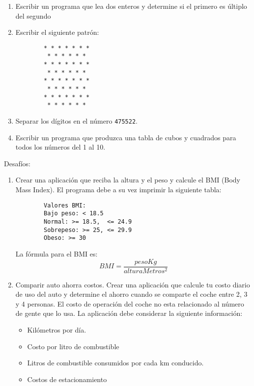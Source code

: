 \documentclass[12pt]{article}
\begin{document}
\begin{enumerate}
\begin{verbatim}
        \end{verbatim}

    \item Escribir un programa que lea dos enteros y determine si el primero es \'ultiplo del segundo
    \item Escribir el siguiente patr\'on:
        \begin{verbatim}
        * * * * * * * 
         * * * * * * 
        * * * * * * *
         * * * * * * 
        * * * * * * *
         * * * * * * 
        * * * * * * *
         * * * * * * 
        \end{verbatim}
    \item Separar los d\'igitos en el n\'umero \texttt{475522}.
    \item Escribir un programa que produzca una tabla de cubos y cuadrados para todos los n\'umeros del 1 al 10.
\end{enumerate}

Desaf\'ios:

\begin{enumerate}
    \item Crear una aplicaci\'on que reciba la altura y el peso y calcule el BMI (Body Mass Index). El programa debe
        a su vez imprimir la siguiente tabla:
        \begin{verbatim}
        Valores BMI: 
        Bajo peso: < 18.5
        Normal: >= 18.5,  <= 24.9
        Sobrepeso: >= 25, <= 29.9
        Obeso: >= 30 
        \end{verbatim}
        La f\'ormula para el BMI es: $$ BMI = \frac{pesoKg}{alturaMetros^2} $$ 
    \item Comparir auto ahorra costos. Crear una aplicaci\'on que calcule tu costo diario de uso del auto y determine el 
        ahorro cuando se comparte el coche entre 2, 3 y 4 personas. El costo de operaci\'on del coche no esta relacionado al
        n\'umero de gente que lo usa.
        La aplicaci\'on debe considerar la siguiente informaci\'on:
        \begin{itemize}
            \item Kil\'ometros por d\'ia.
            \item Costo por litro de combustible
            \item Litros de combustible consumidos por cada km conducido.
            \item Costos de estacionamiento
        \end{itemize}
\end{enumerate}
\end{document}

